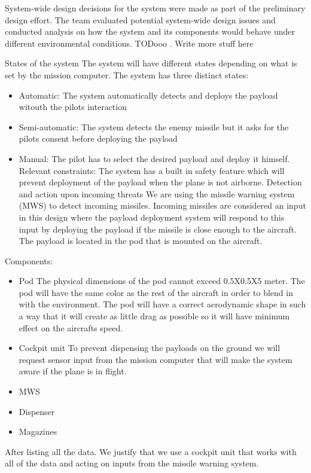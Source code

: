 System-wide design decisions for the system were made as part of the preliminary design effort. The team evaluated potential system-wide design issues and conducted analysis on how the system and its components would behave under different environmental conditions. 
TODooo . Write more stuff here

States of the system
The system will have different states depending on what is set by the mission computer. The system has three distinct states: 
\begin{itemize}
\item Automatic: The system automatically detects and deploys the payload witouth the pilots interaction
\item Semi-automatic: The system detects the enemy missile but it asks for the pilots consent before deploying the payload
\item Manual: The pilot has to select the desired payload and deploy it himself.
Relevant constraints: The system has a built in safety feature which will prevent deployment of the payload when the plane is not airborne.
Detection and action upon incoming threats
We are using the missile warning system (MWS) to detect incoming missiles. Incoming missiles are considered an input in this design where the payload deployment system will respond to this input by deploying the payload if the missile is close enough to the aircraft. The payload is located in the pod that is mounted on the aircraft.
\end{itemize}
Components:
\begin{itemize}

\item Pod
The physical dimensions of the pod cannot exceed 0.5X0.5X5 meter. The pod will have the same color as the rest of the aircraft in order to blend in with the environment. The pod will have a correct aerodynamic shape in such a way that it will create as little drag as possible so it will have minimum effect on the aircrafts speed. 
\item Cockpit unit
To prevent dispensing the payloads on the ground we will request sensor input from the mission computer that will make the system aware if the plane is in flight.
\item MWS
\item Dispenser
\item Magazines

\end{itemize}
After listing all the data. We justify that we use a cockpit unit that works with all of the data and acting on inputs from the missile warning system.
